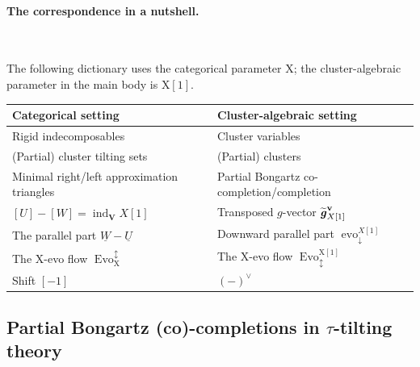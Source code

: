 \documentclass[11pt,reqno]{amsart}
\theoremstyle{plain}
\theoremstyle{definition}
\numberwithin{equation}{section}
\newcommand\<{\langle}
\renewcommand\>{\rangle}
\newcommand{\on}[1]{\operatorname{#1}}
\def\vv{\mathbf{v}}
\def\sink{X}
\newcommand{\flowd}[1]{\on{evo}^{#1}_{\downarrow}}
\newcommand{\DUflow}[1]{\on{Evo}^{\updownarrow}_{#1}}
\newcommand{\flowDU}[1]{\on{Evo}_{\updownarrow}^{#1}}
\newcommand{\pcts}[1]{\mathbf{#1}}%
\newcommand{\ccpt}[1]{\mathrm{#1}}%
\newcommand{\real}[1]{\underline{#1}}%
\def\xevo{\ccpt{X}}%
\newcommand{\bfit}[1]{\textbf{\textit{#1}}}
\def\gvec{\bfit{g}}
\newcommand{\DT}[1]{#1^{\vee}}
\def\tgvec{\widetilde{\gvec}}
\begin{document}
\paragraph{\textbf{The correspondence in a nutshell.}}\

The following dictionary uses the categorical parameter $\xevo$;
the cluster-algebraic parameter in the main body is $\xevo[1]$.
\begin{center}
\small
\renewcommand{\arraystretch}{1.18}
\begin{tabular}{@{}p{.47\linewidth}p{.47\linewidth}@{}}
\hline
Categorical setting & Cluster-algebraic setting\\
\hline
Rigid indecomposables
& Cluster variables\\
(Partial) cluster tilting sets
& (Partial) clusters\\
Minimal right/left approximation triangles
& Partial Bongartz co-completion/completion\\
$[U]-[W]=\on{ind}_{\pcts{V}}X[1]$
& Transposed $g$-vector $\tgvec_{X[1]}^{\vv}$\\
The parallel part $\real{W}-\real{U}$
& Downward parallel part $\flowd{X[1]}$\\
The $\xevo$-evo flow $\DUflow{\xevo}$ 
&The $\xevo$-evo flow $\flowDU{\xevo[1]}$\\
Shift $[-1]$
& $\DT{(-)}$\\
\hline
\end{tabular}
\end{center}

\subsection{Partial Bongartz (co)-completions in $\tau$-tilting theory}
\label{app:tau-tilting}\
\end{document}
